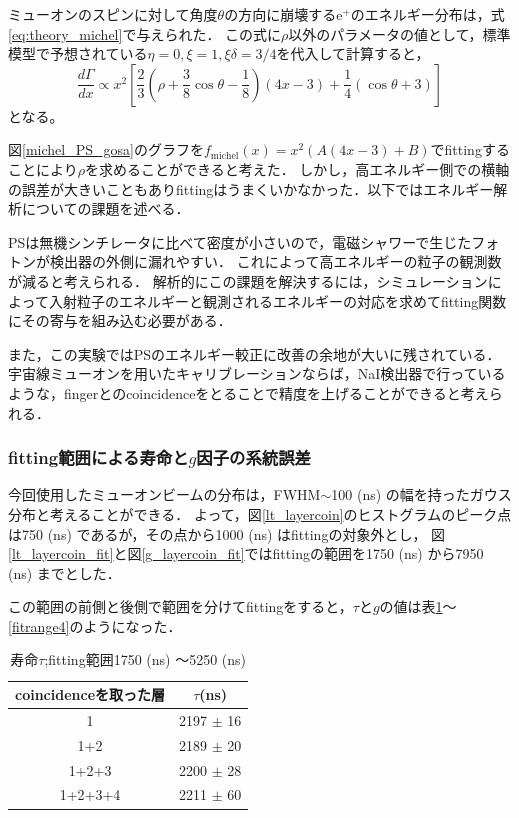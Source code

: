 ミューオンのスピンに対して角度$\theta$の方向に崩壊する$\mathrm{e}^{+}$のエネルギー分布は，式\ref{eq:theory_michel}で与えられた．
この式に$\rho$以外のパラメータの値として，標準模型で予想されている$\eta = 0 , \xi = 1 , \xi \delta = 3/4$を代入して計算すると，
\begin{equation*}
\frac{d\Gamma}{dx} \propto x^{2} [\frac{2}{3}(\rho + \frac{3}{8}\cos \theta - \frac{1}{8})(4x-3) + \frac{1}{4}(\cos \theta + 3)]
\end{equation*}
となる。

図\ref{michel_PS_gosa}のグラフを$f_{\mathrm{michel}}(x) = x^{2} (A(4x -3) + B)$でfittingすることにより$\rho$を求めることができると考えた．
しかし，高エネルギー側での横軸の誤差が大きいこともありfittingはうまくいかなかった．以下ではエネルギー解析についての課題を述べる．

PSは無機シンチレータに比べて密度が小さいので，電磁シャワーで生じたフォトンが検出器の外側に漏れやすい．%
これによって高エネルギーの粒子の観測数が減ると考えられる．%
解析的にこの課題を解決するには，シミュレーションによって入射粒子のエネルギーと観測されるエネルギーの対応を求めてfitting関数にその寄与を組み込む必要がある．%

また，この実験ではPSのエネルギー較正に改善の余地が大いに残されている．
宇宙線ミューオンを用いたキャリブレーションならば，NaI検出器で行っているような，fingerとのcoincidenceをとることで精度を上げることができると考えられる．

\subsubsection{fitting範囲による寿命と$g$因子の系統誤差}
今回使用したミューオンビームの分布は，FWHM$\sim$100 (ns) の幅を持ったガウス分布と考えることができる．
よって，図\ref{lt_layercoin}のヒストグラムのピーク点は750 (ns) であるが，その点から1000 (ns) はfittingの対象外とし，%
図\ref{lt_layercoin_fit}と図\ref{g_layercoin_fit}ではfittingの範囲を1750 (ns) から7950 (ns) までとした．

この範囲の前側と後側で範囲を分けてfittingをすると，$\tau$と$g$の値は表\ref{fitrange1}〜\ref{fitrange4}のようになった．
\begin{table}[H]
\caption{寿命$\tau$;fitting範囲1750 (ns) 〜5250 (ns)}
\label{fitrange1}
\begin{center}
\begin{tabular}{cc}\toprule
coincidenceを取った層 	& $\tau$(ns) \\ \midrule
1 			& 2197 $\pm$ 16 \\
1+2 			& 2189 $\pm$ 20 \\
1+2+3 			& 2200 $\pm$ 28 \\
1+2+3+4 		& 2211 $\pm$ 60 \\ \bottomrule
\end{tabular}
\end{center}
\end{table}%

